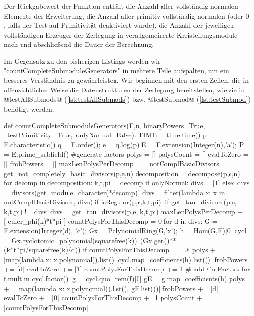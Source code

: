 Der Rückgabewert der Funktion enthält die Anzahl aller vollständig normalen
Elemente der Erweiterung, die Anzahl aller primitiv vollständig normalen (oder
$0$, falls der Test auf Primitivität deaktiviert wurde), 
die Anzahl der jeweiligen vollständigen Erzeuger der Zerlegung in
verallgemeinerte Kreisteilungsmodule nach  und
abschließend die Dauer der Berechnung.

Im Gegensatz zu den bisherigen Listings werden wir
"countCompleteSubmoduleGenerators" in mehrere Teile aufspalten, um ein besseres
Verständnis zu gewährleisten. Wir beginnen mit den ersten Zeilen, die in
offensichtlicher Weise die Datenstrukturen der Zerlegung bereitstellen, wie sie
in @testAllSubmods@ (\autoref{lst:testAllSubmods}) bzw. @testSubmod@ 
(\autoref{lst:testSubmod}) benötigt werden.


\begin{sagecode}[caption={[\texttt{countCompleteSubmoduleGenerators} aus 
 \url{../Sage/enumeratePCNs.spyx}]Aus \url{../Sage/enumeratePCNs.spyx}},
  label={lst:countcompletesubmodulegenerators}]
def countCompleteSubmoduleGenerators(F,n, binaryPowers=True, \
        testPrimitivity=True,\
        onlyNormal=False):
    TIME = time.time()
    p = F.characteristic()
    q = F.order();
    e = q.log(p)
    E = F.extension(Integer(n),'a');
    P = E.prime_subfield()
    #generate factors
    polys = []
    polysCount = []
    evalToZero = []
    frobPowers = []
    maxLenPolysPerDecomp = []
    notComplBasicDivisors = get_not_completely_basic_divisors(p,e,n)
    decomposition = decompose(p,e,n)
    for decomp in decomposition:
        k,t,pi = decomp
        if onlyNormal:
            divs = [1]
        else:
            divs = divisors(get_module_character(*decomp))
            divs = filter(lambda x: x in notComplBasicDivisors, divs)
            if isRegular(p,e,k,t,pi):
                if get_tau_divisors(p,e, k,t,pi) != divs:
                    divs = get_tau_divisors(p,e, k,t,pi)
        maxLenPolysPerDecomp += [ euler_phi(k)*t*pi ]
        countPolysForThisDecomp = 0
        for d in divs:
            G = F.extension(Integer(d), 'c');
            Gx = PolynomialRing(G,'x'); 
            h = Hom(G,E)[0]
            cycl = Gx.cyclotomic_polynomial(squarefree(k))\
                    (Gx.gen()**(k*t*pi/squarefree(k)/d))
            if countPolysForThisDecomp == 0:
                polys += [map(lambda x: x.polynomial().list(),
                    cycl.map_coefficients(h).list())]
                frobPowers += [d]
                evalToZero += [1]
                countPolysForThisDecomp += 1
            # add Co-Factors
            for f,mult in cycl.factor():
                g = cycl.quo_rem(f)[0]
                gE = g.map_coefficients(h)
                polys += [map(lambda x: x.polynomial().list(), gE.list())]
                frobPowers += [d]
                evalToZero += [0]
                countPolysForThisDecomp +=1
        polysCount += [countPolysForThisDecomp]
\end{sagecode}

